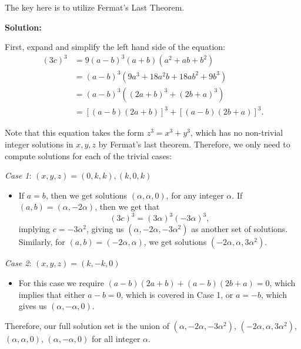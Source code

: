 The key here is to utilize Fermat's Last Theorem.\V

\begin{solution}
\textbf{Solution}\textbf{:}\V

First, expand and simplify the left hand side of the equation:
\begin{align*}
    (3c)^3 &= 9(a-b)^3(a+b)(a^2+ab+b^2)\\
    &= (a-b)^3(9a^3+18a^2b+18ab^2+9b^3)\\
    &= (a-b)^3((2a+b)^3 + (2b+a)^3) \\
    &= \left[(a-b)(2a+b)\right]^3 + \left[(a-b)(2b+a)\right]^3.
\end{align*}

Note that this equation takes the form $z^3 = x^3+y^3$, which has no non-trivial integer solutions in $x,y,z$ by Fermat's last theorem. Therefore, we only need to compute solutions for each of the trivial cases: \V

\textit{Case 1}: $(x,y,z) = (0,k,k), (k,0,k)$
\begin{itemize}
    \item[] If $a=b$, then we get solutions $(\alpha, \alpha,0)$, for any integer $\alpha$. If $(a,b) = (\alpha, -2\alpha)$, then we get that 
    \[(3c)^3 = (3\alpha)^3(-3\alpha)^3,\]
    implying $c = -3\alpha^2$, giving us $(\alpha, -2\alpha, -3\alpha^2)$ as another set of solutions. Similarly, for $(a,b) = (-2\alpha, \alpha)$, we get solutions $(-2\alpha, \alpha, 3\alpha^2)$.
\end{itemize}
\textit{Case 2}: $(x,y,z) = (k,-k,0)$
\begin{itemize}
    \item[] For this case we require $(a-b)(2a+b)+(a-b)(2b+a)=0$, which implies that either $a-b=0$, which is covered in Case 1, or $a=-b$, which gives us $(\alpha, -\alpha, 0)$.
\end{itemize}

Therefore, our full solution set is the union of $(\alpha, -2\alpha, -3\alpha^2)$, $(-2\alpha, \alpha, 3\alpha^2)$, $(\alpha, \alpha, 0)$, $(\alpha, -\alpha, 0)$ for all integer $\alpha$.
\end{solution}\V

